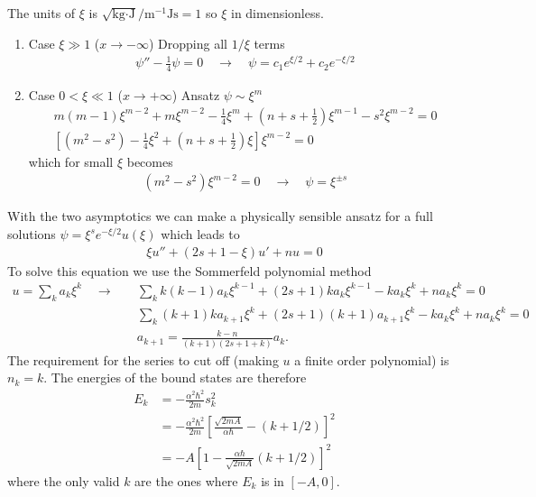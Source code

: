 \documentclass[10pt,a4paper]{book}
\theoremstyle{definition}
\begin{document}
The units of $\xi$ is $\sqrt{\text{kg}\cdot \text{J}}/\text{m}^{-1}\text{Js}=1$ so $\xi$ in dimensionless.
\begin{enumerate}
    \item Case $\xi\gg 1$ ($x\rightarrow-\infty$)
    Dropping all $1/\xi$ terms
    \begin{align}
        \psi''-\frac{1}{4}\psi=0\quad\rightarrow\quad\psi=c_1 e^{\xi/2}+c_2 e^{-\xi/2}
    \end{align}
    \item Case $0<\xi\ll 1$ ($x\rightarrow+\infty$)
    Ansatz $\psi\sim\xi^m$
    \begin{align}
        m(m-1)\xi^{m-2}+m\xi^{m-2}-\frac{1}{4}\xi^m+\left(n+s+\frac{1}{2}\right)\xi^{m-1}-s^2\xi^{m-2}=0\\
        \left[(m^2-s^2)-\frac{1}{4}\xi^2+\left(n+s+\frac{1}{2}\right)\xi\right]\xi^{m-2}=0
    \end{align}
    which for small $\xi$ becomes
    \begin{align}
        (m^2-s^2)\xi^{m-2}=0 \quad\rightarrow\quad\psi=\xi^{\pm s}
    \end{align}
\end{enumerate}
With the two asymptotics we can make a physically sensible ansatz for a full solutions $\psi=\xi^s e^{-\xi/2}u(\xi)$ which leads to
\begin{align}
    \xi u''+(2s+1-\xi)u'+n u=0
\end{align}
To solve this equation we use the Sommerfeld polynomial method
\begin{align}
    u=\sum_ka_k\xi^k\quad\rightarrow\quad
    &\sum_kk(k-1)a_k\xi^{k-1}+(2s+1)ka_k\xi^{k-1}-ka_k\xi^k+na_k\xi^k=0\\
    &\sum_k(k+1)ka_{k+1}\xi^{k}+(2s+1)(k+1)a_{k+1}\xi^{k}-ka_k\xi^k+na_k\xi^k=0\\
    &a_{k+1}=\frac{k-n}{(k+1)(2s+1+k)}a_k.
\end{align}
The requirement for the series to cut off (making $u$ a finite order polynomial) is $n_k=k$. The energies of the bound states are therefore
\begin{align}
    E_k&=-\frac{\alpha^2\hbar^2}{2m}s_k^2\\
    &=-\frac{\alpha^2\hbar^2}{2m}\left[\frac{\sqrt{2mA}}{\alpha\hbar}-(k+1/2)\right]^2\\
    &=-A\left[1-\frac{\alpha\hbar}{\sqrt{2mA}}(k+1/2)\right]^2
\end{align}
where the only valid $k$ are the ones where $E_k$ is in $[-A,0]$.
\end{document}
